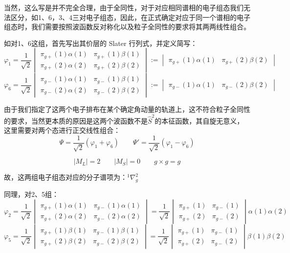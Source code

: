 当然，这么写是并不完全合理，由于全同性，对于对应相同谱相的电子组态我们无法区分，如1、6，3、4三对电子组态，因此，在正式确定对应于同一个谱相的电子组态时，我们需要按照波函数反对称化以及粒子全同性的要求将其两两线性组合。

如对1、6这组，首先写出其价层的 Slater 行列式，并定义简写：
\[
\varphi_1=\frac{1}{\sqrt{2}}
\begin{vmatrix}
    \pi_{g+}(1)\alpha(1) & \pi_{g+}(1)\beta(1) \\
    \pi_{g+}(2)\alpha(2) & \pi_{g+}(2)\beta(2)
\end{vmatrix}
:=
\begin{vmatrix}
    \pi_{g+}(1)\alpha(1) & \pi_{g+}(2)\beta(2)
\end{vmatrix}
\]
\[
\varphi_6=\frac{1}{\sqrt{2}}
\begin{vmatrix}
    \pi_{g-}(1)\alpha(1) & \pi_{g-}(1)\beta(1) \\
    \pi_{g-}(2)\alpha(2) & \pi_{g-}(2)\beta(2)
\end{vmatrix}
:=
\begin{vmatrix}
    \pi_{g-}(1)\alpha(1) & \pi_{g-}(2)\beta(2)
\end{vmatrix}
\]

由于我们指定了这两个电子排布在某个确定角动量的轨道上，这不符合粒子全同性的要求，当然更本质的原因是这两个波函数不是$\hat{S}^2$的本征函数，其自旋无意义，这里需要对两个态进行正交线性组合：
\[\Psi=\frac{1}{\sqrt{2}}(\varphi_1+\varphi_6) \qquad \Psi'=\frac{1}{\sqrt{2}}(\varphi_1-\varphi_6)\]

\[|M_L|=2 \qquad |M_S|=0 \qquad g \times g=g\]

故，这两组电子组态对应的分子谱项为：$^1\nabla^2_g$

同理，对2、5组：
\[
\varphi_2=\frac{1}{\sqrt{2}}
\begin{vmatrix}
    \pi_{g+}(1)\alpha(1) & \pi_{g-}(1)\alpha(1) \\
    \pi_{g+}(2)\alpha(2) & \pi_{g-}(2)\alpha(2)
\end{vmatrix}
=\frac{1}{\sqrt{2}}
\begin{vmatrix}
    \pi_{g+}(1) & \pi_{g-}(1) \\
    \pi_{g+}(2) & \pi_{g-}(2)
\end{vmatrix}
\alpha(1)\alpha(2)
\]
\[
\varphi_5=\frac{1}{\sqrt{2}}
\begin{vmatrix}
    \pi_{g+}(1)\beta(1) & \pi_{g-}(1)\beta(1) \\
    \pi_{g+}(2)\beta(2) & \pi_{g-}(2)\beta(2)
\end{vmatrix}
=\frac{1}{\sqrt{2}}
\begin{vmatrix}
    \pi_{g+}(1) & \pi_{g-}(1) \\
    \pi_{g+}(2) & \pi_{g-}(2)
\end{vmatrix}
\beta(1)\beta(2)
\]

